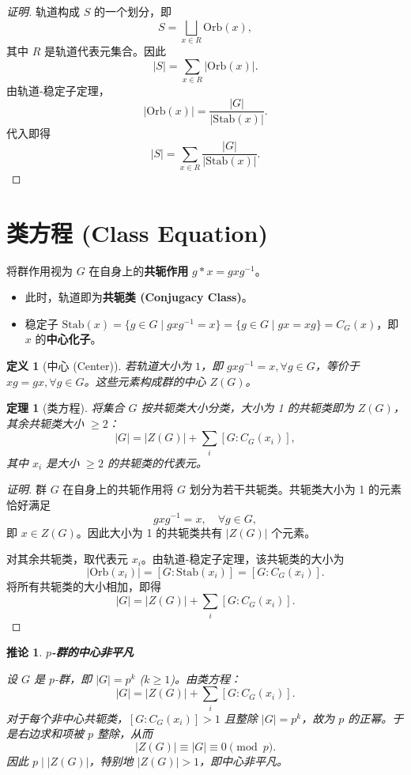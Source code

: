 \documentclass[11pt,a4paper]{ctexart}
\newtheorem*{theorem}{定理}
\newtheorem*{corollary}{推论}
\newtheorem*{definition}{定义}
\theoremstyle{remark}
\begin{document}
\begin{proof}[证明]
轨道构成 \(S\) 的一个划分，即
\[
S=\bigsqcup_{x\in R} \mathrm{Orb}(x),
\]
其中 \(R\) 是轨道代表元集合。因此
\[
|S|=\sum_{x\in R}|\mathrm{Orb}(x)|.
\]
由轨道-稳定子定理，
\[
|\mathrm{Orb}(x)|=\frac{|G|}{|\mathrm{Stab}(x)|}.
\]
代入即得
\[
|S| = \sum_{x \in R} \frac{|G|}{|\mathrm{Stab}(x)|}.
\]
\end{proof}

\section*{类方程 (Class Equation)}

将群作用视为 \(G\) 在自身上的\textbf{共轭作用} \(g * x = gxg^{-1}\)。
\begin{itemize}
    \item 此时，轨道即为\textbf{共轭类 (Conjugacy Class)}。
    \item 稳定子 \(\mathrm{Stab}(x) = \{g \in G \mid gxg^{-1} = x\} = \{g \in G \mid gx = xg\} = C_G(x)\)，即 \(x\) 的\textbf{中心化子}。
\end{itemize}

\begin{definition}[中心 (Center)]
若轨道大小为 \(1\)，即 \(gxg^{-1} = x, \forall g \in G\)，等价于 \(xg = gx, \forall g \in G\)。这些元素构成群的中心 \(Z(G)\)。
\end{definition}

\begin{theorem}[类方程]
将集合 \(G\) 按共轭类大小分类，大小为 1 的共轭类即为 \(Z(G)\)，其余共轭类大小 \(\ge 2\)：
\[
|G| = |Z(G)| + \sum_{i} [G : C_G(x_i)],
\]
其中 \(x_i\) 是大小 \(\ge 2\) 的共轭类的代表元。
\end{theorem}

\begin{proof}[证明]
群 \(G\) 在自身上的共轭作用将 \(G\) 划分为若干共轭类。共轭类大小为 1 的元素恰好满足
\[
gxg^{-1}=x,\quad \forall g\in G,
\]
即 \(x\in Z(G)\)。因此大小为 1 的共轭类共有 \(|Z(G)|\) 个元素。

对其余共轭类，取代表元 \(x_i\)。由轨道-稳定子定理，该共轭类的大小为
\[
|\mathrm{Orb}(x_i)|=[G:\mathrm{Stab}(x_i)]=[G:C_G(x_i)].
\]
将所有共轭类的大小相加，即得
\[
|G| = |Z(G)| + \sum_{i} [G : C_G(x_i)].
\]
\end{proof}

\begin{corollary}\textbf{\(p\)-群的中心非平凡}

设 \(G\) 是 \(p\)-群，即 \(|G| = p^k\) (\(k \ge 1\))。由类方程：
\[
|G| = |Z(G)| + \sum_{i} [G : C_G(x_i)].
\]
对于每个非中心共轭类，\([G:C_G(x_i)]>1\) 且整除 \(|G|=p^k\)，故为 \(p\) 的正幂。于是右边求和项被 \(p\) 整除，从而
\[
|Z(G)| \equiv |G| \equiv 0 \pmod p.
\]
因此 \(p\mid |Z(G)|\)，特别地 \(|Z(G)|>1\)，即中心非平凡。
\end{corollary}
\end{document}
